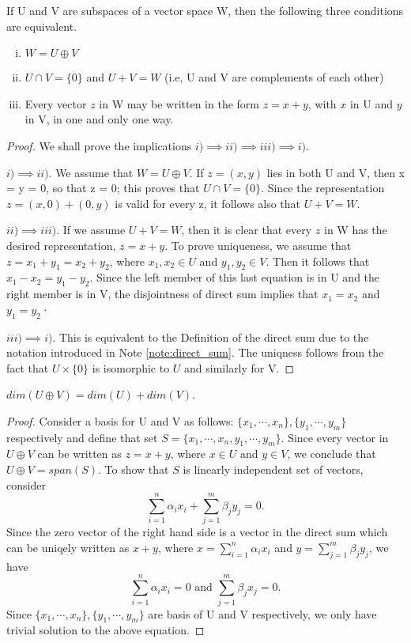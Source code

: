 \documentclass[10pt,a4paper]{article}
\begin{document}
\begin{theorem}\label{thm:direct_sum}
    If U and V are subspaces of a vector space W, then the following three conditions are equivalent.
    \begin{enumerate}[i)]
        \item $W = U\oplus V$
        \item $U\cap V = \{0\}$ and $U + V = W$ (i.e, U and V are complements of each other)
        \item Every vector $z$ in W may be written in the form $z = x + y$, with $x$ in U and $y$ in V, in one and only one way.
    \end{enumerate}
\end{theorem}

\begin{proof}
    We shall prove the implications $i)\implies ii)\implies iii)\implies i)$. 
    
    $i)\implies ii)$. We assume that $W = U\oplus V$. If $z = (x, y)$ lies in both U and V, then x = y = 0, so that z = 0; this proves that $U\cap V = \{0\}$. Since the representation $z = (x, 0) + (0, y)$ is valid for every z, it follows also that $U + V = W$.

    $ii)\implies iii)$. If we assume $U + V = W$, then it is clear that every $z$ in W has the desired representation, $z = x + y$. To prove uniqueness, we assume that $z = x_1+y_1 = x_2 +y_2$, where $x_1,x_2\in U$ and $y_1,y_2\in V$. Then it follows that $x_1-x_2=y_1-y_2$. Since the left member of this last equation is in U and the right member is in V, the disjointness of direct sum implies that $x_1 = x_2$ and $y_1=y_2$·

    $iii)\implies i)$. This is equivalent to the Definition of the direct sum due to the notation introduced in Note \ref{note:direct_sum}. The uniqness follows from the fact that $U\times\{0\}$ is isomorphic to $U$ and similarly for V.
\end{proof}

\begin{theorem}\label{thm:dim_direct_sum}
    $dim(U\oplus V) = dim(U)+dim(V)$.
\end{theorem}

\begin{proof}
    Consider a basis for U and V as follows: $\{x_1, \cdots,x_n\}, \{y_1,\cdots,y_m\}$ respectively and define that set $S=\{x_1, \cdots,x_n, y_1,\cdots,y_m\}$. Since every vector in $U\oplus V$ can be written as $z=x+y$, where $x\in U$ and $y\in V$, we conclude that $U\oplus V=span(S)$. To show that $S$ is linearly independent set of vectors, consider 
    $$
        \sum_{i=1}^n\alpha_ix_i +\sum_{j=1}^m\beta_jy_j = 0.
    $$
    Since the zero vector of the right hand side is a vector in the direct sum which can be uniqely written as $x+y$, where $x=\sum_{i=1}^n\alpha_ix_i$ and $y=\sum_{j=1}^m\beta_jy_j$, we have
    $$
    \sum_{i=1}^n\alpha_ix_i = 0\text{ and }\sum_{j=1}^m\beta_jx_j = 0.
    $$
    Since $\{x_1, \cdots,x_n\}, \{y_1,\cdots,y_m\}$ are basis of U and V respectively, we only have trivial solution to the above equation.
\end{proof}
\end{document}
